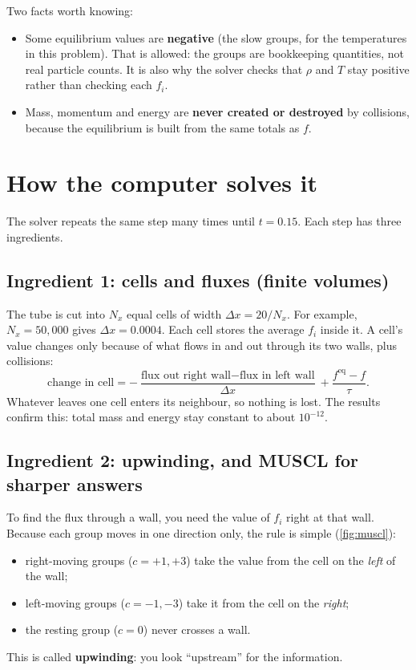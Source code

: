 \documentclass[11pt]{article}
\newcommand{\feq}{f^{\mathrm{eq}}}
\begin{document}
Two facts worth knowing:
\begin{itemize}
  \item Some equilibrium values are \textbf{negative} (the slow groups, for the
        temperatures in this problem).  That is allowed: the groups are
        bookkeeping quantities, not real particle counts.  It is also why the
        solver checks that $\rho$ and $T$ stay positive rather than checking each
        $f_i$.
  \item Mass, momentum and energy are \textbf{never created or destroyed} by
        collisions, because the equilibrium is built from the same totals as $f$.
\end{itemize}

\section{How the computer solves it}

The solver repeats the same step many times until $t = 0.15$.  Each step has three
ingredients.

\subsection{Ingredient 1: cells and fluxes (finite volumes)}
The tube is cut into $N_x$ equal cells of width $\Delta x = 20/N_x$.  For example,
$N_x = 50{,}000$ gives $\Delta x = 0.0004$.  Each cell stores the average $f_i$
inside it.  A cell's value changes only because of what flows in and out through
its two walls, plus collisions:
\[
  \text{change in cell} = -\frac{\text{flux out right wall} - \text{flux in left wall}}{\Delta x} + \frac{\feq - f}{\tau}.
\]
Whatever leaves one cell enters its neighbour, so nothing is lost.  The results
confirm this: total mass and energy stay constant to about $10^{-12}$.

\subsection{Ingredient 2: upwinding, and MUSCL for sharper answers}
To find the flux through a wall, you need the value of $f_i$ right at that wall.
Because each group moves in one direction only, the rule is simple
(\cref{fig:muscl}):
\begin{itemize}
  \item right-moving groups ($c = +1, +3$) take the value from the cell on the
        \emph{left} of the wall;
  \item left-moving groups ($c = -1, -3$) take it from the cell on the \emph{right};
  \item the resting group ($c = 0$) never crosses a wall.
\end{itemize}
This is called \textbf{upwinding}: you look ``upstream'' for the information.
\end{document}
